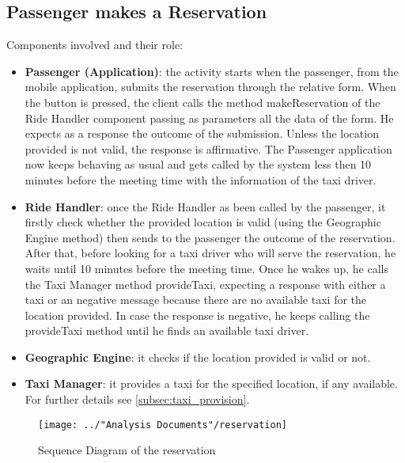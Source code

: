\subsection{Passenger makes a Reservation}
Components involved and their role:
\begin{itemize}
	\item \textbf{Passenger (Application)}: the activity starts when the passenger, from the mobile application, submits the reservation through the relative form. When the button is pressed, the client calls the method makeReservation of the Ride Handler component passing as parameters all the data of the form. He expects as a response the outcome of the submission. Unless the location provided is not valid, the response is affirmative. The Passenger application now keeps behaving as usual and gets called by the system less then 10 minutes before the meeting time with the information of the taxi driver.
	\item \textbf{Ride Handler}: once the Ride Handler as been called by the passenger, it firstly check whether the provided location is valid (using the Geographic Engine method) then sends to the passenger the outcome of the reservation. After that, before looking for a taxi driver who will serve the reservation, he waits until 10 minutes before the meeting time. Once he wakes up, he calls the Taxi Manager method provideTaxi, expecting a response with either a taxi or an negative message because there are no available taxi for the location provided. In case the response is negative, he keeps calling the provideTaxi method until he finds an available taxi driver.
	\item \textbf{Geographic Engine}: it checks if the location provided is valid or not.
	\item \textbf{Taxi Manager}: it provides a taxi for the specified location, if any available. For further details see \ref{subsec:taxi_provision}.
\end{itemize}
\begin{figure}[H]
	\centering
	\texttt{[image: ../"Analysis Documents"/reservation]}
	\label{fig:reservation_seq}
	\caption{Sequence Diagram of the reservation}
\end{figure}

